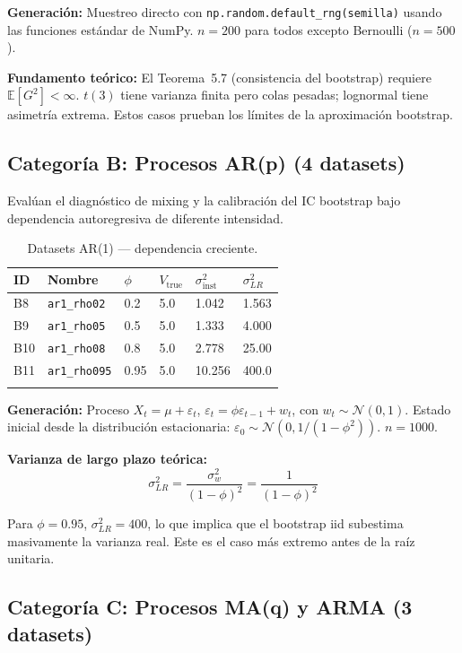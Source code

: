 \documentclass[12pt,a4paper]{article}
\begin{document}
\textbf{Generación:} Muestreo directo con \texttt{np.random.default\_rng(semilla)} usando las funciones estándar de NumPy. $n = 200$ para todos excepto Bernoulli ($n=500$).

\textbf{Fundamento teórico:} El Teorema~5.7 (consistencia del bootstrap) requiere $\mathbb{E}[G^2] < \infty$. $t(3)$ tiene varianza finita pero colas pesadas; lognormal tiene asimetría extrema. Estos casos prueban los límites de la aproximación bootstrap.

\subsection{Categoría B: Procesos AR(p) (4 datasets)}

Evalúan el diagnóstico de mixing y la calibración del IC bootstrap bajo dependencia autoregresiva de diferente intensidad.

\begin{longtable}{@{}llllll@{}}
    \toprule
    ID & Nombre & $\phi$ & $V_{\text{true}}$ & $\sigma^2_{\text{inst}}$ & $\sigma^2_{LR}$ \\
    \midrule
    \endhead
    B8 & \texttt{ar1\_rho02} & 0.2 & 5.0 & 1.042 & 1.563 \\
    B9 & \texttt{ar1\_rho05} & 0.5 & 5.0 & 1.333 & 4.000 \\
    B10 & \texttt{ar1\_rho08} & 0.8 & 5.0 & 2.778 & 25.00 \\
    B11 & \texttt{ar1\_rho095} & 0.95 & 5.0 & 10.256 & 400.0 \\
    \bottomrule
    \caption{Datasets AR(1) --- dependencia creciente.}
\end{longtable}

\textbf{Generación:} Proceso $X_t = \mu + \varepsilon_t$, $\varepsilon_t = \phi \varepsilon_{t-1} + w_t$, con $w_t \sim \mathcal{N}(0, 1)$. Estado inicial desde la distribución estacionaria: $\varepsilon_0 \sim \mathcal{N}(0, 1/(1-\phi^2))$. $n = 1000$.

\textbf{Varianza de largo plazo teórica:}
\[
\sigma^2_{LR} = \frac{\sigma^2_w}{(1-\phi)^2} = \frac{1}{(1-\phi)^2}
\]

Para $\phi = 0.95$, $\sigma^2_{LR} = 400$, lo que implica que el bootstrap iid subestima masivamente la varianza real. Este es el caso más extremo antes de la raíz unitaria.

\subsection{Categoría C: Procesos MA(q) y ARMA (3 datasets)}
\end{document}
